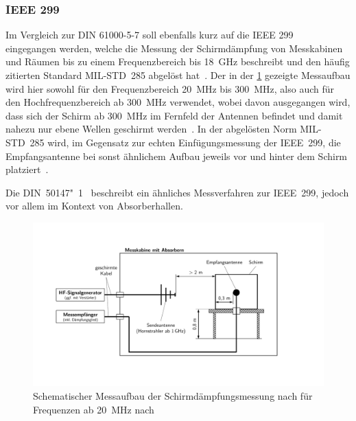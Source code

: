 
\subsubsection{IEEE 299}

Im Vergleich zur DIN 61000-5-7 soll ebenfalls kurz auf die IEEE 299~\cite{IEEE_299} eingegangen werden, welche die Messung der Schirmdämpfung von Messkabinen und Räumen bis zu einem Frequenzbereich bis \SI{18}{\giga\hertz} beschreibt und den häufig zitierten Standard MIL-STD~285 abgelöst hat~\cite{EM_Schirmung}. Der in der \Abb\ref{fig:2_Schematik-Schirmdaempfungsmessung_IEEE_299} gezeigte Messaufbau wird hier sowohl für den Frequenzbereich \SI{20}{\mega\hertz} bis \SI{300}{\mega\hertz}, also auch für den Hochfrequenzbereich ab \SI{300}{\mega\hertz} verwendet, wobei davon ausgegangen wird, dass sich der Schirm ab \SI{300}{\mega\hertz} im Fernfeld der Antennen befindet und damit nahezu nur ebene Wellen geschirmt \mbox{werden}~\cite{EM_Schirmung, IEEE_299}. In der abgelösten Norm MIL-STD~285 wird, im Gegensatz zur echten Einfügungsmessung der IEEE~299, die Empfangsantenne bei sonst ähnlichem Aufbau jeweils vor und hinter dem Schirm platziert~\cite{EM_Schirmung}.
\par
\vspace{\linespace}
Die DIN~50147"~1~\cite{DIN_EN_50147-1} beschreibt ein ähnliches Messverfahren zur IEEE~299, jedoch vor allem im Kontext von Absorberhallen.  

\begin{figure}[ht]
    \centering
    \includegraphics[page = 2, trim = 2cm 3cm 4cm 3cm, clip, width=.9\textwidth]{Abbildungen/Kapitel2/Schematiken_Schirmdaempfungsmessung.pdf}
    \caption[Schematischer Messaufbau der Schirmdämpfungsmessung nach \citeauthor{IEEE_299} für Frequenzen ab \SI{20}{\mega\hertz}]{Schematischer Messaufbau der Schirmdämpfungsmessung nach \citeauthor{IEEE_299} für Frequenzen ab \SI{20}{\mega\hertz} nach~\cite{IEEE_299}}
    \label{fig:2_Schematik-Schirmdaempfungsmessung_IEEE_299}
\end{figure}


